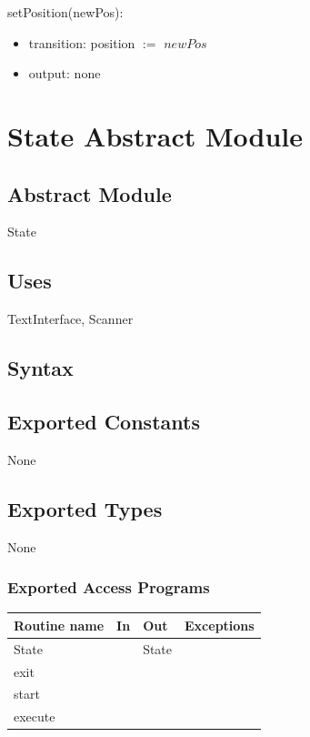 \documentclass[12pt]{article}
\begin{document}
\noindent setPosition(newPos):
\begin{itemize}
\item transition: position $:=$ $newPos$
\item output: none
\end{itemize}

\newpage

\section* {State Abstract Module}

\subsection* {Abstract Module}

State

\subsection*{Uses}

TextInterface, Scanner

\subsection* {Syntax}

\subsection*{Exported Constants}

None

\subsection*{Exported Types}

None

\subsubsection* {Exported Access Programs}

\begin{tabular}{| l | l | l | p{6cm} |}
\hline
\textbf{Routine name} & \textbf{In} & \textbf{Out} & \textbf{Exceptions}\\
\hline
State & ~ & State & ~\\
\hline
exit & ~ & ~ & \\
\hline
start & ~ & ~ & \\
\hline
execute & ~ & ~ & \\
\hline
\end{tabular}
\end{document}
